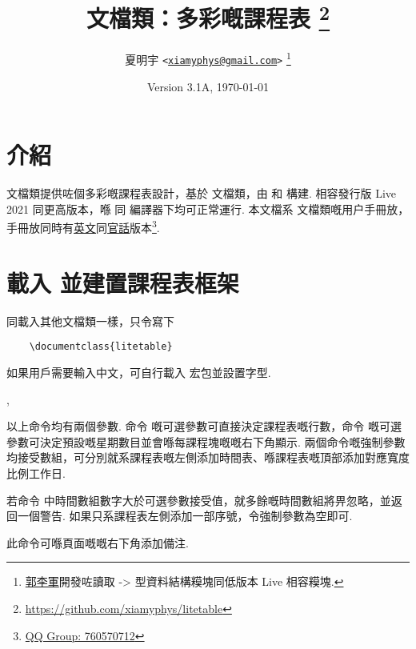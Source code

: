 \documentclass[letterpaper]{l3doc}
\title
{
  \bfseries\cls{litetable} 文檔類：多彩嘅課程表
  \footnote{\url{https://github.com/xiamyphys/litetable}}
}
\author
{
  夏明宇 \texttt{<\href{mailto:xiamyphys@gmail.com}{xiamyphys@gmail.com}>}
  \thanks{\href{https://github.com/ljguo1020}{郭李軍}開發咗讀取 \meta{left} -> \meta{right} 型資料結構糢塊同低版本 \hologo{TeX} Live 相容糢塊.}
}
\date{Version 3.1A, \today}
\begin{document}
\maketitle

\section{介紹}

 文檔類提供咗個多彩嘅課程表設計，基於  文檔類，由  和  構建. 相容發行版  Live 2021 同更高版本，喺  同  編譯器下均可正常運行. 本文檔系  文檔類嘅用户手冊放，手冊放同時有\href{./litetable-en.pdf}{英文}同\href{./litetable-cn.pdf}{官話}版本\footnote{\href{https://qm.qq.com/q/RyssAhG4qy}{QQ Group: 760570712}}.

\section{載入  並建置課程表框架}

同載入其他文檔類一樣，只令寫下

\begin{framed}
  \begin{verbatim}
    \documentclass{litetable}
  \end{verbatim}
\end{framed}

如果用戶需要輸入中文，可自行載入  宏包並設置字型.

\begin{function}{\timelist,\weeklist}
  \begin{syntax}
                 
        
  \end{syntax}

  以上命令均有兩個參數. 命令  嘅可選參數可直接決定課程表嘅行數，命令  嘅可選參數可決定預設嘅星期數目並會喺每課程塊嘅嘅右下角顯示. 兩個命令嘅強制參數均接受數組，可分別就系課程表嘅左側添加時間表、喺課程表嘅頂部添加對應寬度比例工作日.
  
  若命令  中時間數組數字大於可選參數接受值，就多餘嘅時間數組將畀忽略，並返回一個警告. 如果只系課程表左側添加一部序號，令強制參數為空即可.
\end{function}

\begin{function}{\more}
  \begin{syntax}
  \end{syntax}

  此命令可喺頁面嘅嘅右下角添加備注.
\end{function}
\end{document}
